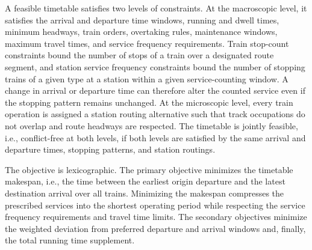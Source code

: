 A feasible timetable satisfies two levels of constraints. At the macroscopic level, it satisfies the arrival and departure time windows, running and dwell times, minimum headways, train orders, overtaking rules, maintenance windows, maximum travel times, and service frequency requirements. Train stop-count constraints bound the number of stops of a train over a designated route segment, and station service frequency constraints bound the number of stopping trains of a given type at a station within a given service-counting window. A change in arrival or departure time can therefore alter the counted service even if the stopping pattern remains unchanged. At the microscopic level, every train operation is assigned a station routing alternative such that track occupations do not overlap and route headways are respected. The timetable is jointly feasible, i.e., conflict-free at both levels, if both levels are satisfied by the same arrival and departure times, stopping patterns, and station routings.

The objective is lexicographic. The primary objective minimizes the timetable makespan, i.e., the time between the earliest origin departure and the latest destination arrival over all trains. Minimizing the makespan compresses the prescribed services into the shortest operating period while respecting the service frequency requirements and travel time limits. The secondary objectives minimize the weighted deviation from preferred departure and arrival windows and, finally, the total running time supplement.

